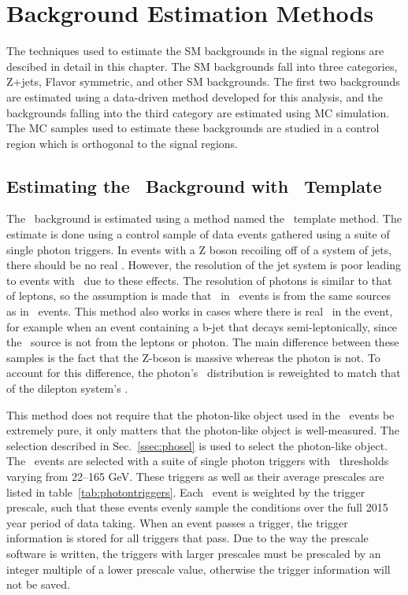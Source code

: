 \chapter{Background Estimation Methods}
\label {ch:bkgd}
The techniques used to estimate the SM backgrounds in the signal regions are descibed in detail in this chapter.
The SM backgrounds fall into three categories, Z+jets, Flavor symmetric, and other SM backgrounds.
The first two backgrounds are estimated using a data-driven method developed for this analysis,
and the backgrounds falling into the third category are estimated using MC simulation.
The MC samples used to estimate these backgrounds are studied in a control region which is orthogonal to the signal regions.

\section{Estimating the \texorpdfstring{\zjets}{Z+jets}\ Background with \texorpdfstring{\MET}{MET}\ Template}
\label{sec:bkg_zjets}
The \zjets\ background is estimated using a method named the \MET\ template method.
The estimate is done using a control sample of data events gathered using a suite of single photon triggers.
In events with a Z boson recoiling off of a system of jets, there should be no real \MET.
However, the resolution of the jet system is poor leading to events with \MET\ due to these effects.
The resolution of photons is similar to that of leptons,
so the assumption is made that \MET\ in \gjets\ events is from the same sources as in \zjets\ events.
This method also works in cases where there is real \MET\ in the event,
for example when an event containing a b-jet that decays semi-leptonically,
since the \MET\ source is not from the leptons or photon.
The main difference between these samples is the fact that the Z-boson is massive whereas the photon is not.
To account for this difference,
the photon's \pt\ distribution is reweighted to match that of the dilepton system's \pt.

This method does not require that the photon-like object used in the \gjets\ events be extremely pure,
it only matters that the photon-like object is well-measured.
The selection described in Sec.~\ref{ssec:phosel} is used to select the photon-like object.
The \gjets\ events are selected with a suite of single photon triggers with \pt\ thresholds varying from 22--165 GeV.
These triggers as well as their average prescales are listed in table~\ref{tab:photontriggers}.
Each \gjets\ event is weighted by the trigger prescale, such that these events evenly sample the conditions over the full 2015 year period of data taking.
When an event passes a trigger, the trigger information is stored for all triggers that pass.
Due to the way the prescale software is written,
the triggers with larger prescales must be prescaled by an integer multiple of a lower prescale value,
otherwise the trigger information will not be saved.

